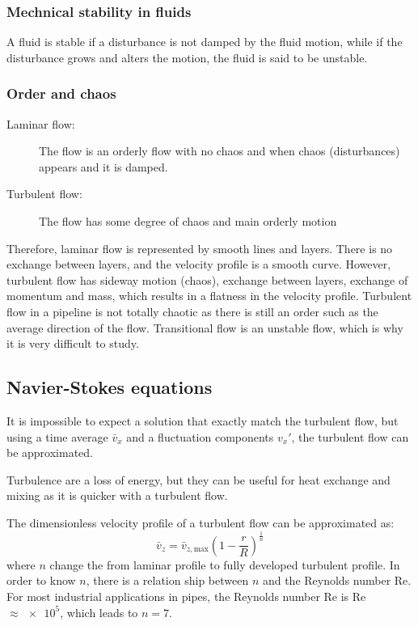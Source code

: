 \documentclass[10pt, twocolumn]{article}
\begin{document}
\subsubsection{Mechnical stability in fluids}
A fluid is stable if a disturbance is not damped by the fluid motion, while if the disturbance grows and alters the motion, the fluid is said to be unstable.


\subsubsection{Order and chaos}
\begin{description}
  \item[Laminar flow:] The flow is an orderly flow with no chaos and when chaos (disturbances) appears and it is damped.
  \item[Turbulent flow:] The flow has some degree of chaos and main orderly motion
\end{description}

Therefore, laminar flow is represented by smooth lines and layers.
There is no exchange between layers, and the velocity profile is a smooth curve.\newline
However, turbulent flow has sideway motion (chaos), exchange between layers, exchange of momentum and mass, which results in a flatness in the velocity profile.
Turbulent flow in a pipeline is not totally chaotic as there is still an order such as the average direction of the flow.\newline
Transitional flow is an unstable flow, which is why it is very difficult to study.


\subsection{Navier-Stokes equations}
It is impossible to expect a solution that exactly match the turbulent flow, but using a time average \(\bar{v}_x\) and a fluctuation components \(v_x'\), the turbulent flow can be approximated.

Turbulence are a loss of energy, but they can be useful for heat exchange and mixing as it is quicker with a turbulent flow.

The dimensionless velocity profile of a turbulent flow can be approximated as:
\[
  \bar{v}_z = \bar{v}_{z,\mathrm{max}}\left( 1 - \frac{r}{R} \right)^\frac{1}{n}
\]
where \(n\) change the from laminar profile to fully developed turbulent profile.
In order to know \(n\), there is a relation ship between \(n\) and the Reynolds number Re.
For most industrial applications in pipes, the Reynolds number Re is Re \(\approx \num{e5}\), which leads to \(n = 7\).
\end{document}
